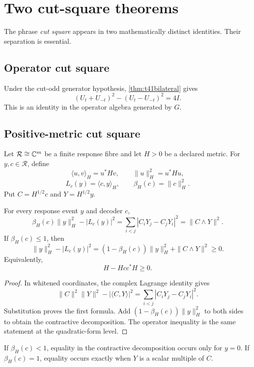 \section{Two cut-square theorems}\label{sec:metric-cut-square}

The phrase \emph{cut square} appears in two mathematically distinct identities. Their separation is essential.

\subsection{Operator cut square}

Under the cut-odd generator hypothesis, \cref{thm:t41bilateral} gives
\[
 \boxed{(U_t+U_{-t})^2-(U_t-U_{-t})^2=4I.}
\]
This is an identity in the operator algebra generated by $G$.

\subsection{Positive-metric cut square}

Let $\mathcal R\cong\mathbb C^m$ be a finite response fibre and let $H>0$ be a declared metric. For $y,c\in\mathcal R$, define
\[
 \langle u,v\rangle_H=u^*Hv,
 \qquad
 \|u\|_H^2=u^*Hu,
\]
\[
 L_c(y)=\langle c,y\rangle_H,
 \qquad
 \beta_H(c)=\|c\|_H^2.
\]
Put $C=H^{1/2}c$ and $Y=H^{1/2}y$.

\begin{theorem}\label{thm:metriccutsquare}
For every response event $y$ and decoder $c$,
\[
 \boxed{
 \beta_H(c)\|y\|_H^2-|L_c(y)|^2
 =\sum_{i<j}|C_iY_j-C_jY_i|^2
 =\|C\wedge Y\|^2.}
\]
If $\beta_H(c)\le1$, then
\[
 \boxed{
 \|y\|_H^2-|L_c(y)|^2
 =(1-\beta_H(c))\|y\|_H^2+\|C\wedge Y\|^2\ge0.}
\]
Equivalently,
\[
 H-Hcc^*H\ge0.
\]
\end{theorem}

\begin{proof}
In whitened coordinates, the complex Lagrange identity gives
\[
 \|C\|^2\|Y\|^2-|\langle C,Y\rangle|^2
 =\sum_{i<j}|C_iY_j-C_jY_i|^2.
\]
Substitution proves the first formula. Add $(1-\beta_H(c))\|y\|_H^2$ to both sides to obtain the contractive decomposition. The operator inequality is the same statement at the quadratic-form level.
\end{proof}

\begin{corollary}
If $\beta_H(c)<1$, equality in the contractive decomposition occurs only for $y=0$. If $\beta_H(c)=1$, equality occurs exactly when $Y$ is a scalar multiple of $C$.
\end{corollary}

